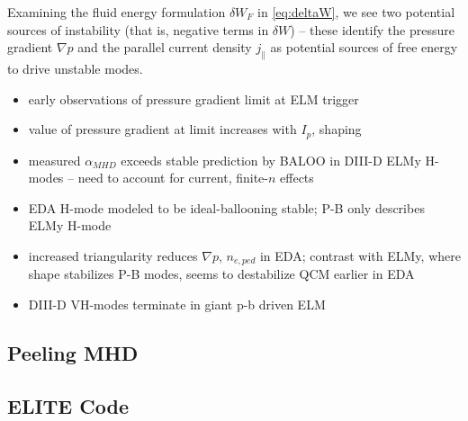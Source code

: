 Examining the fluid energy formulation $\delta W_F$ in \cref{eq:deltaW}, we see two potential sources of instability (that is, negative terms in $\delta W$) -- these identify the pressure gradient $\nabla p$ and the parallel current density $j_\parallel$ as potential sources of free energy to drive unstable modes.

\begin{itemize}
 \item early observations of pressure gradient limit at ELM trigger \cite{Kamada1996,Suttrop2000}
 \item value of pressure gradient at limit increases with $I_p$, shaping \cite{Suttrop2000a}
 \item measured $\alpha_{MHD}$ exceeds stable prediction by BALOO in DIII-D ELMy H-modes -- need to account for current, finite-$n$ effects \cite{Groebner1998a,Osborne1998}
 \item EDA H-mode modeled to be ideal-ballooning stable; P-B only describes ELMy H-mode \cite{Mossessian2002}
 \item increased triangularity reduces $\nabla p$, $n_{e,ped}$ in EDA; contrast with ELMy, where shape stabilizes P-B modes, seems to destabilize QCM earlier in EDA \cite{Hughes2007a}
 \item DIII-D VH-modes terminate in giant p-b driven ELM \cite{Turnbull2003}
\end{itemize}

\subsection{Peeling MHD}\label{subsec:mod_peel}

\subsection{ELITE Code}\label{subsec:mod_elite}

